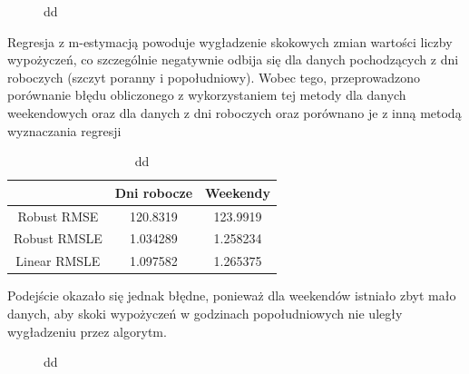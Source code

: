 \documentclass[a4paper,12pt]{article}
\begin{document}
    \begin{figure}[!htb]
        \center
        \caption{dd}
    \end{figure}
    
    Regresja z m-estymacją powoduje wygładzenie skokowych zmian wartości liczby wypożyczeń, co  szczególnie negatywnie odbija się dla danych pochodzących z dni roboczych (szczyt poranny i popołudniowy). Wobec tego, przeprowadzono porównanie błędu obliczonego z wykorzystaniem tej metody dla danych weekendowych oraz dla danych z dni roboczych oraz porównano je z inną metodą wyznaczania regresji

    \begin{table}
    	\centering
        \begin{tabular}{|c|c|c|}
                \hline
                & Dni robocze & Weekendy \\
                \hline
                Robust RMSE & 120.8319 & 123.9919 \\
                \hline
                Robust RMSLE & 1.034289 & 1.258234 \\
                \hline
                Linear RMSLE & 1.097582 & 1.265375 \\
                \hline
        \end{tabular}
        \caption{dd}
    \end{table}
    
    Podejście okazało się jednak błędne, ponieważ dla weekendów istniało zbyt mało danych, aby skoki wypożyczeń w godzinach popołudniowych nie uległy wygładzeniu przez algorytm.
    
    \begin{figure}[!htb]
        \center
        \caption{dd}
    \end{figure}
    
\end{document}
